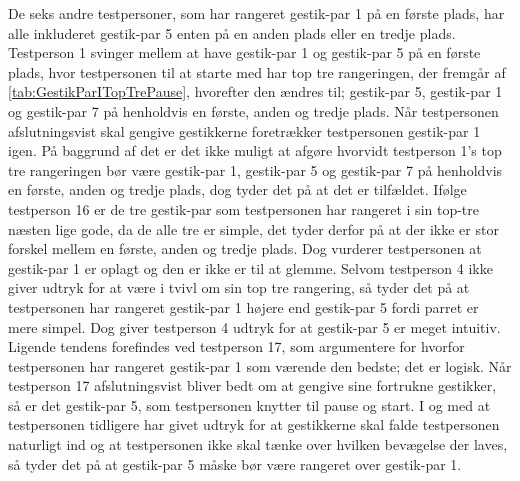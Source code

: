 De seks andre testpersoner, som har rangeret gestik-par 1 på en første plads, har alle inkluderet gestik-par 5 enten på en anden plads eller en tredje plads. Testperson 1 svinger mellem at have gestik-par 1 og gestik-par 5 på en første plads, hvor testpersonen til at starte med har top tre rangeringen, der fremgår af \autoref{tab:GestikParITopTrePause}, hvorefter den ændres til; gestik-par 5, gestik-par 1 og gestik-par 7 på henholdvis en første, anden og tredje plads. Når testpersonen afslutningsvist skal gengive gestikkerne foretrækker testpersonen gestik-par 1 igen. På baggrund af det er det ikke muligt at afgøre hvorvidt testperson 1's top tre rangeringen bør være gestik-par 1, gestik-par 5 og gestik-par 7 på henholdvis en første, anden og tredje plads, dog tyder det på at det er tilfældet. Ifølge testperson 16 er de tre gestik-par som testpersonen har rangeret i sin top-tre næsten lige gode, da de alle tre er simple, det tyder derfor på at der ikke er stor forskel mellem en første, anden og tredje plads. Dog vurderer testpersonen at gestik-par 1 er oplagt og den er ikke er til at glemme. Selvom testperson 4 ikke giver udtryk for at være i tvivl om sin top tre rangering, så tyder det på at testpersonen har rangeret gestik-par 1 højere end gestik-par 5 fordi parret er mere simpel. Dog giver testperson 4 udtryk for at gestik-par 5 er meget intuitiv. Ligende tendens forefindes ved testperson 17, som argumentere for hvorfor testpersonen har rangeret gestik-par 1 som værende den bedste; det er logisk. Når testperson 17 afslutningsvist bliver bedt om at gengive sine fortrukne gestikker, så er det gestik-par 5, som testpersonen knytter til pause og start. I og med at testpersonen tidligere har givet udtryk for at gestikkerne skal falde testpersonen naturligt ind og at testpersonen ikke skal tænke over hvilken bevægelse der laves, så tyder det på at gestik-par 5 måske bør være rangeret over gestik-par 1.   

